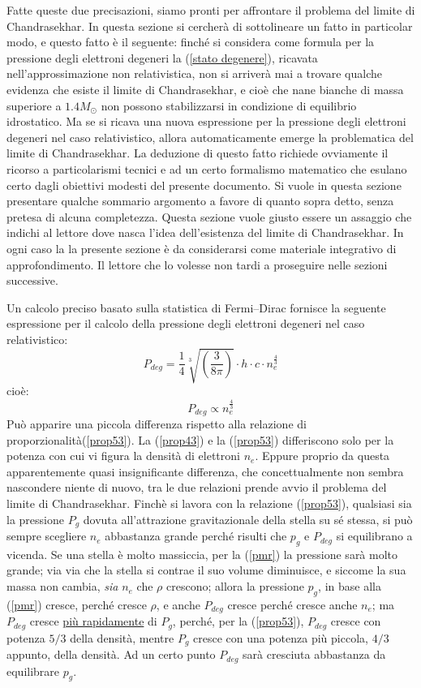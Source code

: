 Fatte queste due precisazioni, siamo pronti per affrontare il problema del limite di Chandrasekhar. In questa sezione si cercher\`{a} di sottolineare un fatto in particolar modo, e questo fatto è il seguente: finché si considera come formula per la pressione degli elettroni degeneri la (\ref{stato degenere}), ricavata nell'approssimazione non relativistica, non si arriver\`{a} mai a trovare qualche evidenza che esiste il limite di Chandrasekhar, e cioè che nane bianche di massa superiore a $1.4 M_{\odot}$ non possono stabilizzarsi in condizione di equilibrio idrostatico. Ma se si ricava una nuova espressione per la pressione degli elettroni degeneri nel caso relativistico, allora automaticamente emerge la problematica del limite di Chandrasekhar. La deduzione di questo fatto richiede ovviamente il ricorso a particolarismi tecnici e ad un certo formalismo matematico che esulano certo dagli obiettivi modesti del presente documento. Si vuole in questa sezione presentare qualche sommario argomento a favore di quanto sopra detto, senza pretesa di alcuna completezza. Questa sezione vuole giusto essere un assaggio che indichi al lettore dove nasca l'idea dell'esistenza del limite di Chandrasekhar. In ogni caso la la presente sezione è da considerarsi come materiale integrativo di approfondimento. Il lettore che lo volesse non tardi a proseguire nelle sezioni successive.
\par
Un calcolo preciso basato sulla statistica di Fermi--Dirac fornisce la seguente espressione per il calcolo della pressione degli elettroni degeneri nel caso relativistico:
\begin{equation}
P_{deg}=\frac{1}{4} \sqrt[3]{\left( \frac{3}{8\pi} \right)} \cdot h \cdot c\cdot n_{e}^{\frac{4}{3}}
\end{equation}
cioè:
\begin{equation}\label{prop43}
P_{deg} \propto n_{e}^{\frac{4}{3}}
\end{equation}
Può apparire una piccola differenza rispetto alla relazione di proporzionalit\`{a}(\ref{prop53}). La (\ref{prop43}) e la (\ref{prop53}) differiscono solo per la potenza con cui vi figura la densit\`{a} di elettroni $n_{e}$. Eppure proprio da questa apparentemente quasi insignificante differenza, che concettualmente non sembra nascondere niente di nuovo, tra le due relazioni prende avvio il problema del limite di Chandrasekhar.
Finchè si lavora con la relazione (\ref{prop53}), qualsiasi sia la pressione $P_{g}$ dovuta all'attrazione gravitazionale della stella su sé stessa, si può sempre scegliere $n_{e}$ abbastanza grande perch\'{e} risulti che $p_{g}$ e $P_{deg}$ si equilibrano a vicenda. Se una stella è molto massiccia, per la (\ref{pmr}) la pressione sar\`{a} molto grande; via via che la stella si contrae il suo volume diminuisce, e siccome la sua massa non cambia, \emph{sia} $n_{e}$ che $\rho$ crescono; allora la pressione $p_{g}$, in base alla (\ref{pmr}) cresce, perch\'{e} cresce $\rho$, e anche $P_{deg}$ cresce perch\'{e} cresce anche $n_{e}$; ma $P_{deg}$ cresce \underline{più rapidamente} di $P_{g}$, perch\'{e}, per la (\ref{prop53}), $P_{deg}$ cresce con potenza $5/3$ della densit\`{a}, mentre $P_{g}$ cresce con una potenza più piccola, $4/3$ appunto, della densit\`{a}. Ad un certo punto $P_{deg}$ sar\`{a} cresciuta abbastanza da equilibrare $p_{g}$.
